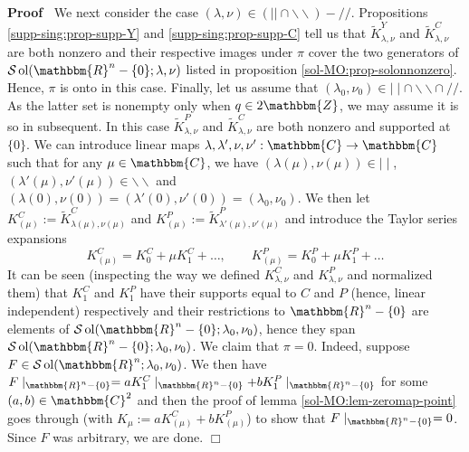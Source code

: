 \documentclass{article}
\newcommand{\assign}{:=}
\newcommand{\tmop}[1]{\ensuremath{\operatorname{#1}}}
\renewenvironment{proof}{\noindent\textbf{Proof\ }}{\hspace*{\fill}$\Box$\medskip}
\theoremstyle{remark}
\begin{document}
\begin{proof}
  We next consider the case $(\lambda, \nu) \in (| | \cap
  \backslash\backslash) - / /$. Propositions \ref{supp-sing:prop-supp-Y} and
  \ref{supp-sing:prop-supp-C} tell us that $\tilde{K}_{\lambda, \nu}^Y$ and
  $\tilde{K}_{\lambda, \nu}^C$ are both nonzero and their respective images
  under $\pi$ cover the two generators of $\mathcal{S} \tmop{ol}
  (\mathbbm{R}^n - \{ 0 \} ; \lambda, \nu)$ listed in proposition
  \ref{sol-MO:prop-solonnonzero}. Hence, $\pi$ is onto in this case. Finally,
  let us assume that $(\lambda_0, \nu_0) \in \mid \mid \cap
  \backslash\backslash \cap / /$. As the latter set is nonempty only when $q
  \in 2\mathbbm{Z}$, we may assume it is so in subsequent. In this case
  $\tilde{K}_{\lambda, \nu}^P$ and $\tilde{K}_{\lambda, \nu}^C$ are both
  nonzero and supported at $\{ 0 \}$. We can introduce linear maps $\lambda,
  \lambda', \nu, \nu' : \mathbbm{C} \rightarrow \mathbbm{C}$ such that for any
  $\mu \in \mathbbm{C}$, we have $(\lambda (\mu), \nu (\mu)) \in \mid
  \mid$, $(\lambda' (\mu), \nu' (\mu)) \in \backslash\backslash$ and
  $(\lambda (0), \nu (0)) = (\lambda' (0), \nu' (0)) = (\lambda_0, \nu_0)$.
  We then let $K^C_{(\mu)} \assign \tilde{K}_{\lambda (\mu), \nu (\mu)}^C$ and
  $K^P_{(\mu)} \assign \tilde{K}^P_{\lambda' (\mu), \nu' (\mu)}$ and introduce
  the Taylor series expansions
  \[ K^C_{(\mu)} = K^C_0 + \mu K_1^C + \ldots, \qquad K^P_{(\mu)} = K_0^P +
     \mu K_1^P + \ldots \]
  It can be seen (inspecting the way we defined $K_{\lambda, \nu}^C$ and
  $K_{\lambda, \nu}^P$ and normalized them) that $K_1^C$ and $K_1^P$ have
  their supports equal to $C$ and $P$ (hence, linear independent) respectively
  and their restrictions to $\mathbbm{R}^n - \{ 0 \}$ are elements of
  $\mathcal{S} \tmop{ol} (\mathbbm{R}^n - \{ 0 \} ; \lambda_0, \nu_0)$, hence
  they span $\mathcal{S} \tmop{ol} (\mathbbm{R}^n - \{ 0 \} ; \lambda_0,
  \nu_0)$. We claim that $\pi = 0$. Indeed, suppose $F \in \mathcal{S}
  \tmop{ol} (\mathbbm{R}^n ; \lambda_0, \nu_0)$. We then have $F
  \mid_{\mathbbm{R}^n - \{ 0 \}} = a K_1^C \mid_{\mathbbm{R}^n - \{ 0
  \}} + b K_1^P \mid_{\mathbbm{R}^n - \{ 0 \}}$ for some $(a, b) \in
  \mathbbm{C}^2$ and then the proof of lemma \ref{sol-MO:lem-zeromap-point}
  goes through (with $K_{\mu} \assign a K_{(\mu)}^C + b K^P_{(\mu)}$) to show
  that $F \mid_{\mathbbm{R}^n - \{ 0 \}} = 0$. Since $F$ was arbitrary, we
  are done.
\end{proof}


\end{document}
